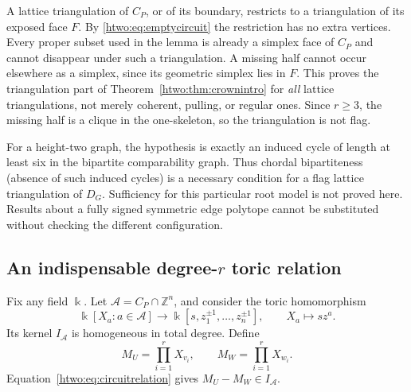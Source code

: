 \documentclass[11pt]{article}
\numberwithin{equation}{section}
\theoremstyle{definition}
\newcommand{\Z}{\mathbb Z}
\begin{document}
A lattice triangulation of $C_P$, or of its boundary, restricts to a
triangulation of its exposed face $F$. By \eqref{htwo:eq:emptycircuit} the
restriction has no extra vertices. Every proper subset used in the lemma
is already a simplex face of $C_P$ and cannot disappear under such a
triangulation. A missing half cannot occur elsewhere as a simplex, since
its geometric simplex lies in $F$. This proves the triangulation part
of Theorem~\ref{htwo:thm:crownintro} for \emph{all} lattice triangulations,
not merely coherent, pulling, or regular ones. Since $r\ge3$, the
missing half is a clique in the one-skeleton, so the triangulation is
not flag.

For a height-two graph, the hypothesis is exactly an induced cycle of
length at least six in the bipartite comparability graph. Thus chordal
bipartiteness (absence of such induced cycles) is a necessary condition
for a flag lattice triangulation of $D_G$. Sufficiency for this particular
root model is not proved here. Results about a fully signed symmetric
edge polytope cannot be substituted without checking the different
configuration.

\subsection{An indispensable degree-$r$ toric relation}

Fix any field $\Bbbk$. Let $\mathcal A=C_P\cap\Z^n$, and consider the
toric homomorphism
\[
 \Bbbk[X_a:a\in\mathcal A]\longrightarrow
 \Bbbk[s,z_1^{\pm1},\ldots,z_n^{\pm1}],\qquad
 X_a\longmapsto s z^a.
\]
Its kernel $I_{\mathcal A}$ is homogeneous in total degree. Define
\[
 M_U=\prod_{i=1}^rX_{v_i},\qquad
 M_W=\prod_{i=1}^rX_{w_i}.
\]
Equation~\eqref{htwo:eq:circuitrelation} gives $M_U-M_W\in I_{\mathcal A}$.
\end{document}
